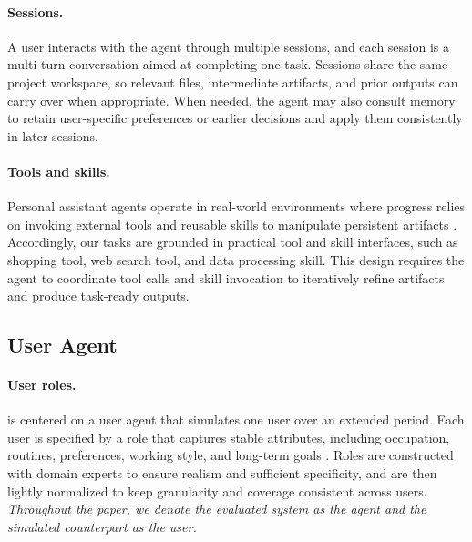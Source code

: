 \paragraph{Sessions.}
A user interacts with the agent through multiple {sessions}, and each session is a multi-turn conversation aimed at completing one task. Sessions share the same project workspace, so relevant files, intermediate artifacts, and prior outputs can carry over when appropriate. When needed, the agent may also consult memory to retain user-specific preferences or earlier decisions and apply them consistently in later sessions.

\paragraph{Tools and skills.}
Personal assistant agents operate in real-world environments where progress relies on invoking external tools and reusable skills to manipulate persistent artifacts \citep{schick2023toolformer,yao2024tau,patil2024gorilla,wang2026skillx}.
Accordingly, our tasks are grounded in practical tool and skill interfaces, such as shopping tool, web search tool, and data processing skill. This design requires the agent to coordinate tool calls and skill invocation to iteratively refine artifacts and produce task-ready outputs.

\subsection{User Agent}
\label{sec:user_agent}

\paragraph{User roles.}
{\bench} is centered on a {user agent} that simulates one user over an extended period. Each user is specified by a role that captures stable attributes, including occupation, routines, preferences, working style, and long-term goals \citep{kim2026persona2web}. 
Roles are constructed with domain experts to ensure realism and sufficient specificity, and are then lightly normalized to keep granularity and coverage consistent across users. \textit{Throughout the paper, we denote the evaluated system as the agent and the simulated counterpart as the user.}


